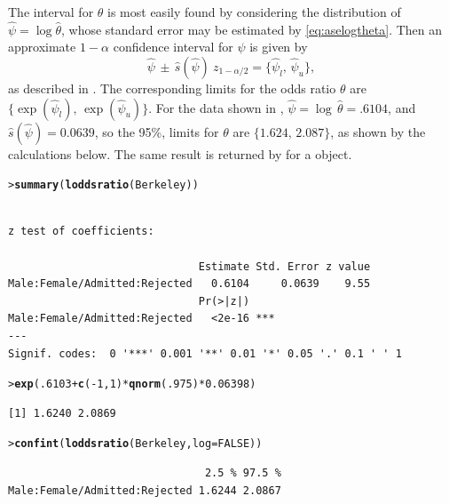 \documentclass[10pt,krantz2]{krantz}\usepackage[]{graphicx}\usepackage[]{color}
\makeatletter
\newcommand{\hlnum}[1]{\textcolor[rgb]{0.686,0.059,0.569}{#1}}%
\newcommand{\hlopt}[1]{\textcolor[rgb]{0,0,0}{#1}}%
\newcommand{\hlstd}[1]{\textcolor[rgb]{0.345,0.345,0.345}{#1}}%
\newcommand{\hlkwc}[1]{\textcolor[rgb]{0.333,0.667,0.333}{#1}}%
\newcommand{\hlkwd}[1]{\textcolor[rgb]{0.737,0.353,0.396}{\textbf{#1}}}%
\newenvironment{kframe}{%
 \def\at@end@of@kframe{}%
 \ifinner\ifhmode%
  \def\at@end@of@kframe{\end{minipage}}%
  \begin{minipage}{\columnwidth}%
 \fi\fi%
 \def\FrameCommand##1{\hskip\@totalleftmargin \hskip-\fboxsep
 \colorbox{shadecolor}{##1}\hskip-\fboxsep
     \hskip-\linewidth \hskip-\@totalleftmargin \hskip\columnwidth}%
 \MakeFramed {\advance\hsize-\width
   \@totalleftmargin\z@ \linewidth\hsize
   \@setminipage}}%
 {\par\unskip\endMakeFramed%
 \at@end@of@kframe}
\newenvironment{knitrout}{}{} %
\renewenvironment{knitrout}{\small\renewcommand{\baselinestretch}{.85}}{} %
\makeatother
\begin{document}
The interval for \(\theta\) is most easily found by considering the
distribution of \(\hat{\psi}  =  \log  \hat{\theta} \), whose standard
error may be estimated by \eqref{eq:aselogtheta}.  Then an approximate \(1  -  \alpha\) confidence
interval for \(\psi\) is given by
\begin{equation*}
 \hat{\psi} \,\pm\,  \hat{s} ( \hat{\psi} )  \:
z_{ 1 - \alpha  / 2 } =  \{ \hat{\psi}_l , \,  \hat{\psi}_u \}
 \comma
\end{equation*}
as described in .
The
corresponding limits for the odds ratio \(\theta\) are
\(\{ \exp ( \hat{\psi}_l ) , \,  \exp ( \hat{\psi}_u ) \}\).  For the data
shown in ,
\(\hat{\psi}  =  \log \,  \hat{\theta} =  .6104\),
and \(\hat{s}  ( \hat{\psi} )  =  0.0639\), so the 95\%,
limits for \(\theta\) are \(\{ 1.624, \,  2.087 \}\),
as shown by the calculations below. The same result is returned by  for a
 object.
\begin{knitrout}
\color{fgcolor}\begin{kframe}
\begin{alltt}
\hlstd{> }\hlkwd{summary}\hlstd{(}\hlkwd{loddsratio}\hlstd{(Berkeley))}
\end{alltt}
\begin{verbatim}

z test of coefficients:

                              Estimate Std. Error z value
Male:Female/Admitted:Rejected   0.6104     0.0639    9.55
                              Pr(>|z|)    
Male:Female/Admitted:Rejected   <2e-16 ***
---
Signif. codes:  0 '***' 0.001 '**' 0.01 '*' 0.05 '.' 0.1 ' ' 1
\end{verbatim}
\begin{alltt}
\hlstd{> }\hlkwd{exp}\hlstd{(}\hlnum{.6103} \hlopt{+} \hlkwd{c}\hlstd{(}\hlopt{-}\hlnum{1}\hlstd{,} \hlnum{1}\hlstd{)} \hlopt{*} \hlkwd{qnorm}\hlstd{(}\hlnum{.975}\hlstd{)} \hlopt{*} \hlnum{0.06398}\hlstd{)}
\end{alltt}
\begin{verbatim}
[1] 1.6240 2.0869
\end{verbatim}
\begin{alltt}
\hlstd{> }\hlkwd{confint}\hlstd{(}\hlkwd{loddsratio}\hlstd{(Berkeley,} \hlkwc{log} \hlstd{=} \hlnum{FALSE}\hlstd{))}
\end{alltt}
\begin{verbatim}
                               2.5 % 97.5 %
Male:Female/Admitted:Rejected 1.6244 2.0867
\end{verbatim}
\end{kframe}
\end{knitrout}
\end{document}
